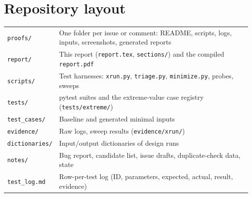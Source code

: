 \documentclass[11pt,a4paper]{article}
\begin{document}
\section{Repository layout}
\begin{tabular}{@{}lL{11.5cm}@{}}
\toprule
\texttt{proofs/} & One folder per issue or comment: README, scripts, logs, inputs, screenshots, generated reports \\
\texttt{report/} & This report (\texttt{report.tex}, \texttt{sections/}) and the compiled \texttt{report.pdf} \\
\texttt{scripts/} & Test harnesses: \texttt{xrun.py}, \texttt{triage.py}, \texttt{minimize.py}, probes, sweeps \\
\texttt{tests/} & pytest suites and the extreme-value case registry (\texttt{tests/extreme/}) \\
\texttt{test\_cases/} & Baseline and generated minimal inputs \\
\texttt{evidence/} & Raw logs, sweep results (\texttt{evidence/xrun/}) \\
\texttt{dictionaries/} & Input/output dictionaries of design runs \\
\texttt{notes/} & Bug report, candidate list, issue drafts, duplicate-check data, state \\
\texttt{test\_log.md} & Row-per-test log (ID, parameters, expected, actual, result, evidence) \\
\bottomrule
\end{tabular}
\end{document}
